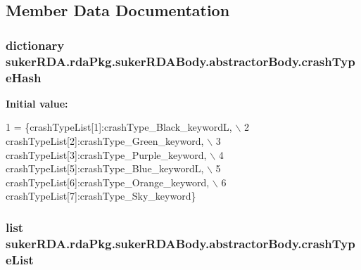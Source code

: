 \subsection{Member Data Documentation}
\hypertarget{classsuker_r_d_a_1_1rda_pkg_1_1suker_r_d_a_body_1_1abstractor_body_aa663b128ab2f702c7d526be8a3b8f1b4}{
\subsubsection[{crash\+Type\+Hash}]{\setlength{\rightskip}{0pt plus 5cm}dictionary suker\+R\+D\+A.\+rda\+Pkg.\+suker\+R\+D\+A\+Body.\+abstractor\+Body.\+crash\+Type\+Hash\hspace{0.3cm}{\ttfamily [static]}}}\label{classsuker_r_d_a_1_1rda_pkg_1_1suker_r_d_a_body_1_1abstractor_body_aa663b128ab2f702c7d526be8a3b8f1b4}
{\bfseries Initial value\+:}
\begin{DoxyCode}
1 = \{crashTypeList[1]:crashType\_Black\_keywordL, \(\backslash\)
2                      crashTypeList[2]:crashType\_Green\_keyword, \(\backslash\)
3                      crashTypeList[3]:crashType\_Purple\_keyword, \(\backslash\)
4                      crashTypeList[5]:crashType\_Blue\_keywordL, \(\backslash\)
5                      crashTypeList[6]:crashType\_Orange\_keyword, \(\backslash\)
6                      crashTypeList[7]:crashType\_Sky\_keyword\}
\end{DoxyCode}
\hypertarget{classsuker_r_d_a_1_1rda_pkg_1_1suker_r_d_a_body_1_1abstractor_body_a0322c22bff6d35f2a4d6e22a3a35a60b}{
\subsubsection[{crash\+Type\+List}]{\setlength{\rightskip}{0pt plus 5cm}list suker\+R\+D\+A.\+rda\+Pkg.\+suker\+R\+D\+A\+Body.\+abstractor\+Body.\+crash\+Type\+List\hspace{0.3cm}{\ttfamily [static]}}}\label{classsuker_r_d_a_1_1rda_pkg_1_1suker_r_d_a_body_1_1abstractor_body_a0322c22bff6d35f2a4d6e22a3a35a60b}
